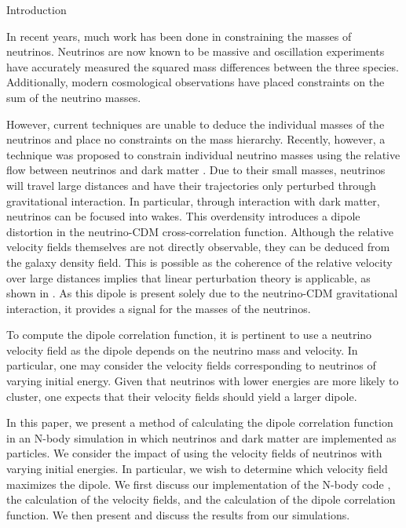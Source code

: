 \begin{section}{Introduction}
  \label{sec:introduction}

In recent years, much work has been done in constraining the masses
of neutrinos. Neutrinos are now known to be massive and oscillation 
experiments have accurately measured the squared mass differences 
between the three species. Additionally, modern cosmological 
observations have placed constraints on the sum of the neutrino 
masses.

\par However, current techniques are unable to deduce the 
individual masses of the neutrinos and place no constraints 
on the mass hierarchy. Recently, however, a technique was 
proposed to constrain individual neutrino masses using the 
relative flow between neutrinos and dark matter \cite{bib:Zhu2013, 
bib:Zhu2014}. Due to their small masses, neutrinos will 
travel large distances and have their trajectories only
 perturbed through gravitational interaction. In particular, 
through interaction with dark matter, neutrinos can be focused 
into wakes. This overdensity introduces a dipole distortion 
in the neutrino-CDM cross-correlation function. Although the 
relative velocity fields themselves are not directly observable, 
they can be deduced from the galaxy density field. This is possible as the 
coherence of the relative velocity over large distances implies 
that linear perturbation theory is applicable, as shown in 
\cite{bib:Inman}. As this dipole is present solely due to the neutrino-CDM 
gravitational interaction, it provides a signal for the masses 
of the neutrinos.

\par To compute the dipole correlation function, it is pertinent 
to use a neutrino velocity field as the dipole depends on the 
neutrino mass and velocity. In particular, one may consider the 
velocity fields corresponding to neutrinos of varying initial 
energy. Given that neutrinos with lower energies are more likely 
to cluster, one expects that their velocity fields should yield 
a larger dipole.  

\par In this paper, we present a method of calculating the 
dipole correlation function in an N-body simulation in which
neutrinos and dark matter are implemented as particles. We consider 
the impact of using the velocity fields of neutrinos with 
varying initial energies. In particular, we wish to determine which
velocity field maximizes the dipole. We first discuss our implementation of 
the N-body code \cpm \cite{bib:HarnoisDeraps2013}, the calculation 
of the velocity fields, and the calculation of the dipole correlation 
function. We then present and discuss the results from our simulations.

\end{section}

